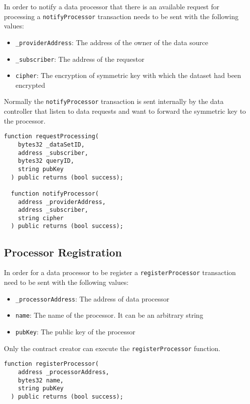 In order to notify a data processor that there is an available request for processing a \verb|notifyProcessor| transaction needs to be sent with the following values:

\begin{itemize}
  \item \verb|_providerAddress|: The address of the owner of the data source
  \item \verb|_subscriber|: The address of the requestor
  \item \verb|cipher|: The encryption of symmetric key with which the dataset had been encrypted
\end{itemize}

Normally the \verb|notifyProcessor| transaction is sent internally by the data controller that listen to data requests and want to forward the symmetric key to the processor.


\begin{lstlisting}[language=Solidity, caption={Request for processing functions}]
  function requestProcessing(
    bytes32 _dataSetID,
    address _subscriber,
    bytes32 queryID,
    string pubKey
  ) public returns (bool success);

  function notifyProcessor(
    address _providerAddress,
    address _subscriber,
    string cipher
  ) public returns (bool success);

\end{lstlisting}

\subsection{Processor Registration}
\label{implemenation:contracts:reg_processor}

In order for a data processor to be register a \verb|registerProcessor| transaction need to be sent with the following values:

\begin{itemize}
  \item \verb|_processorAddress|: The address of data processor
  \item \verb|name|: The name of the processor. It can be an arbitrary string
  \item \verb|pubKey|: The public key of the processor
\end{itemize}

Only the contract creator can execute the \verb|registerProcessor| function.

\begin{lstlisting}[language=Solidity, caption={Data processor registration function}]
  function registerProcessor(
    address _processorAddress,
    bytes32 name,
    string pubKey
  ) public returns (bool success);
\end{lstlisting}


